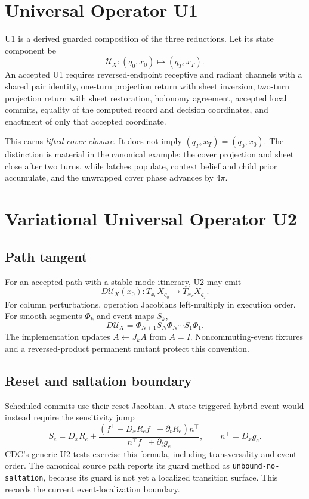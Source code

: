 \documentclass[11pt]{article}
\newcommand{\Uop}{\mathcal{U}}
\begin{document}
\section{Universal Operator U1}

U1 is a derived guarded composition of the three reductions. Let its state
component be
\[
\Uop_X:(q_0,x_0)\longmapsto(q_T,x_T).
\]
An accepted U1 requires reversed-endpoint receptive and radiant channels with a
shared pair identity, one-turn projection return with sheet inversion, two-turn
projection return with sheet restoration, holonomy agreement, accepted local
commits, equality of the computed record and decision coordinates, and
enactment of only that accepted coordinate.

This earns \emph{lifted-cover closure}. It does not imply
$(q_T,x_T)=(q_0,x_0)$. The distinction is material in the canonical example:
the cover projection and sheet close after two turns, while latches populate,
context belief and child prior accumulate, and the unwrapped cover phase advances
by $4\pi$.

\section{Variational Universal Operator U2}

\subsection{Path tangent}

For an accepted path with a stable mode itinerary, U2 may emit
\[
D\Uop_X(x_0):T_{x_0}X_{q_0}\longrightarrow T_{x_T}X_{q_T}.
\]
For column perturbations, operation Jacobians left-multiply in execution order.
For smooth segments $\Phi_k$ and event maps $S_k$,
\begin{equation}
D\Uop_X=\Phi_{N+1}S_N\Phi_N\cdots S_1\Phi_1.
\label{eq:path-tangent}
\end{equation}
The implementation updates $A\leftarrow J_kA$ from $A=I$. Noncommuting-event
fixtures and a reversed-product permanent mutant protect this convention.

\subsection{Reset and saltation boundary}

Scheduled commits use their reset Jacobian. A state-triggered hybrid event would
instead require the sensitivity jump \cite{hiskens2000,kong2024}
\begin{equation}
S_e=D_xR_e+
\frac{(f^+-D_xR_e f^- -\partial_tR_e)n^\top}
     {n^\top f^-+\partial_tg_e},
\qquad n^\top=D_xg_e.
\label{eq:saltation}
\end{equation}
CDC's generic U2 tests exercise this formula, including transversality and event
order. The canonical source path reports its guard method as
\texttt{unbound-no-saltation}, because its guard is not yet a localized
transition surface. This records the current event-localization boundary.
\end{document}
